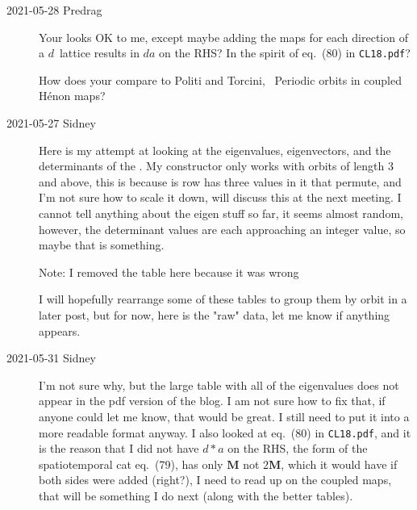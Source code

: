 \begin{description}
\item[2021-05-28 Predrag]
Your {\henSTlatt}  looks OK to me, except maybe adding the
maps for each direction of a $d$\dmn\ lattice results in $da$ on the RHS?
In the spirit of
{eq.~(80)} in \texttt{CL18.pdf}?

How does your {\henSTlatt} compare to Politi and Torcini,
~{Periodic orbits in coupled {H{\'e}non} maps}?

\item[2021-05-27 Sidney]
Here is my attempt at looking at the eigenvalues, eigenvectors, and the
determinants of the {\jacobianOrb}. My {\jacobianOrb} constructor only
works with orbits of length 3 and above, this is because is row has three
values in it that permute, and I'm not sure how to scale it down, will
discuss this at the next meeting. I cannot tell anything about the eigen
stuff so far, it seems almost random, however, the determinant values are
each approaching an integer value, so maybe that is something.

Note: I removed the table here because it was wrong

I will hopefully rearrange some of these tables to group them by orbit in a
later post, but for now, here is the "raw" data, let me know if anything
appears.

\item[2021-05-31 Sidney]
I'm not sure why, but the large table with all of the eigenvalues does
not appear in the pdf version of the blog. I am not sure how to fix that,
if anyone could let me know, that would be great. I still need to put it
into a more readable format anyway. I also looked at
{eq.~(80)} in \texttt{CL18.pdf}, and it is the reason that I did not have
$d*a$ on the RHS, the form of the spatiotemporal cat
{eq.~(79)}, has only $\textbf{M}$ not $2\textbf{M}$, which it would have
if both sides were added (right?), I need to read up on the coupled maps,
that will be something I do next (along with the better tables).


\end{description}

